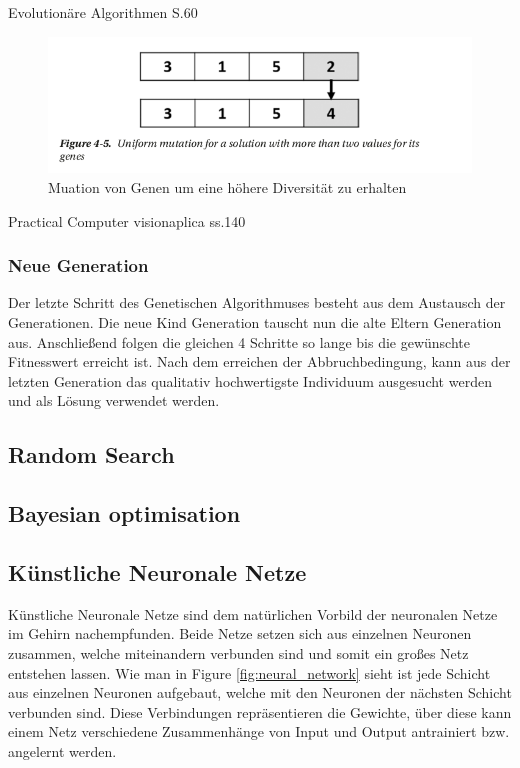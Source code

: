 Evolutionäre Algorithmen S.60


\begin{figure}[H]
  \centering  
  \includegraphics[scale=0.7]{img/mutation.png}
  \caption{Muation von Genen um eine höhere Diversität zu erhalten}
  \label{fig:chromoson_mutation}
\end{figure}

Practical Computer visionaplica ss.140
 
\subsubsection{Neue Generation}
Der letzte Schritt des Genetischen Algorithmuses besteht aus dem Austausch der Generationen. Die neue Kind Generation tauscht nun die alte Eltern Generation aus. Anschließend folgen die gleichen 4 Schritte so lange bis die gewünschte Fitnesswert erreicht ist. Nach dem erreichen der Abbruchbedingung, kann aus der letzten Generation das qualitativ hochwertigste Individuum ausgesucht werden und als Lösung verwendet werden.


\subsection{Random Search}


\subsection{Bayesian optimisation}


\newpage

\subsection{Künstliche Neuronale Netze}

Künstliche Neuronale Netze sind dem natürlichen Vorbild der neuronalen Netze im Gehirn nachempfunden. Beide Netze setzen sich aus einzelnen Neuronen zusammen, welche miteinandern verbunden sind und somit ein großes Netz entstehen lassen. Wie man in Figure \ref{fig:neural_network} sieht ist jede Schicht aus einzelnen Neuronen aufgebaut, welche mit den Neuronen der nächsten Schicht verbunden sind. Diese Verbindungen repräsentieren die Gewichte, über diese kann einem Netz verschiedene Zusammenhänge von Input und Output antrainiert bzw. angelernt werden.



